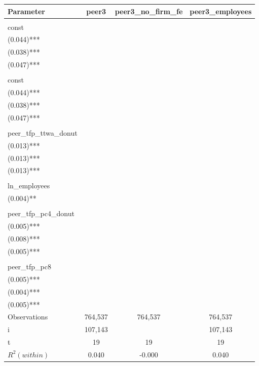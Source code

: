 \begin{center}
	\begin{tabular}{lccc}
		Parameter & peer3 & peer3\_no\_firm\_fe & peer3\_employees \\[0.3em]
		\toprule
		\lblock{
			$\beta_0$
			\\
			const
		} & \cblock{
			$2.075$
			\\
			\footnotesize{(0.044)***}
		} & \cblock{
			$0.310$
			\\
			\footnotesize{(0.038)***}
		} & \cblock{
			$2.035$
			\\
			\footnotesize{(0.047)***}
		}
		\\ [0.9em]
		\lblock{
			$\beta_1$
			\\
			const
		} & \cblock{
			$2.075$
			\\
			\footnotesize{(0.044)***}
		} & \cblock{
			$0.310$
			\\
			\footnotesize{(0.038)***}
		} & \cblock{
			$2.035$
			\\
			\footnotesize{(0.047)***}
		}
		\\ [0.9em]
		\lblock{
			$\beta_2$
			\\
			peer\_tfp\_ttwa\_donut
		} & \cblock{
			$0.033$
			\\
			\footnotesize{(0.013)***}
		} & \cblock{
			$0.204$
			\\
			\footnotesize{(0.013)***}
		} & \cblock{
			$0.033$
			\\
			\footnotesize{(0.013)***}
		}
		\\ [0.9em]
		\lblock{
			$\beta_3$
			\\
			ln\_employees
		} &  &  & \cblock{
			$0.009$
			\\
			\footnotesize{(0.004)**}
		}
		\\ [0.9em]
		\lblock{
			$\beta_4$
			\\
			peer\_tfp\_pc4\_donut
		} & \cblock{
			$0.015$
			\\
			\footnotesize{(0.005)***}
		} & \cblock{
			$0.142$
			\\
			\footnotesize{(0.008)***}
		} & \cblock{
			$0.015$
			\\
			\footnotesize{(0.005)***}
		}
		\\ [0.9em]
		\lblock{
			$\beta_5$
			\\
			peer\_tfp\_pc8
		} & \cblock{
			$0.280$
			\\
			\footnotesize{(0.005)***}
		} & \cblock{
			$0.559$
			\\
			\footnotesize{(0.004)***}
		} & \cblock{
			$0.280$
			\\
			\footnotesize{(0.005)***}
		}
		\\ [1em]
		\hline
		Observations & 764,537 & 764,537 & 764,537
		\\
		i & 107,143 &  & 107,143
		\\
		t & 19 & 19 & 19
		\\
		$R^2 (within)$ & 0.040 & -0.000 & 0.040
		\\
		\bottomrule
	\end{tabular}
\end{center}